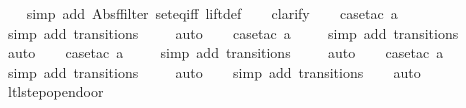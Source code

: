 \begin{isabellebody}
%
\isadelimproof
\ \ %
\endisadelimproof
%
\isatagproof
{}\isamarkupfalse%
\ {\isacharparenleft}simp\ add{\isacharcolon}\ Abs{\isacharunderscore}ffilter\ set{\isacharunderscore}eq{\isacharunderscore}iff\ lift{\isacharunderscore}def{\isacharparenright}\isanewline
\ \ \isamarkupfalse%
\ clarify\isanewline
\ \ \isamarkupfalse%
\ {\isacharparenleft}case{\isacharunderscore}tac\ {\isachardoublequoteopen}a{\isacharequal}{}{\isachardoublequoteclose}{\isacharparenright}\isanewline
\ \ \ \isamarkupfalse%
\ {\isacharparenleft}simp\ add{\isacharcolon}\ transitions{\isacharparenright}\isanewline
\ \ \ \isamarkupfalse%
\ auto{\isacharbrackleft}{}{\isacharbrackright}\isanewline
\ \ \isamarkupfalse%
\ {\isacharparenleft}case{\isacharunderscore}tac\ {\isachardoublequoteopen}a{\isacharequal}{}{\isachardoublequoteclose}{\isacharparenright}\isanewline
\ \ \ \isamarkupfalse%
\ {\isacharparenleft}simp\ add{\isacharcolon}\ transitions{\isacharparenright}\isanewline
\ \ \ \isamarkupfalse%
\ auto{\isacharbrackleft}{}{\isacharbrackright}\isanewline
\ \ \isamarkupfalse%
\ {\isacharparenleft}case{\isacharunderscore}tac\ {\isachardoublequoteopen}a{\isacharequal}{}{\isachardoublequoteclose}{\isacharparenright}\isanewline
\ \ \ \isamarkupfalse%
\ {\isacharparenleft}simp\ add{\isacharcolon}\ transitions{\isacharparenright}\isanewline
\ \ \ \isamarkupfalse%
\ auto{\isacharbrackleft}{}{\isacharbrackright}\isanewline
\ \ \isamarkupfalse%
\ {\isacharparenleft}case{\isacharunderscore}tac\ {\isachardoublequoteopen}a{\isacharequal}{}{\isachardoublequoteclose}{\isacharparenright}\isanewline
\ \ \ \isamarkupfalse%
\ {\isacharparenleft}simp\ add{\isacharcolon}\ transitions{\isacharparenright}\isanewline
\ \ \ \isamarkupfalse%
\ auto{\isacharbrackleft}{}{\isacharbrackright}\isanewline
\ \ \isamarkupfalse%
\ {\isacharparenleft}simp\ add{\isacharcolon}\ transitions{\isacharparenright}\isanewline
\ \ \isamarkupfalse%
\ auto%
\endisatagproof
{\isafoldproof}%
%
\isadelimproof
\isanewline
%
\endisadelimproof
\isanewline
{}\isamarkupfalse%
\ ltl{\isacharunderscore}step{\isacharunderscore}opendoor{\isacharcolon}\isanewline

\end{isabellebody}

